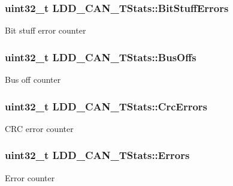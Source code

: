 \subsubsection[{Bit\+Stuff\+Errors}]{\setlength{\rightskip}{0pt plus 5cm}uint32\+\_\+t L\+D\+D\+\_\+\+C\+A\+N\+\_\+\+T\+Stats\+::\+Bit\+Stuff\+Errors}\label{struct_l_d_d___c_a_n___t_stats_a811a427adbc75325167b5073963c676a}
Bit stuff error counter \hypertarget{struct_l_d_d___c_a_n___t_stats_aa01ae74140765599c87675e5df7d8a3d}{}
\subsubsection[{Bus\+Offs}]{\setlength{\rightskip}{0pt plus 5cm}uint32\+\_\+t L\+D\+D\+\_\+\+C\+A\+N\+\_\+\+T\+Stats\+::\+Bus\+Offs}\label{struct_l_d_d___c_a_n___t_stats_aa01ae74140765599c87675e5df7d8a3d}
Bus off counter \hypertarget{struct_l_d_d___c_a_n___t_stats_a27e16f4ddc9cdf544026c4d6ce7b698f}{}
\subsubsection[{Crc\+Errors}]{\setlength{\rightskip}{0pt plus 5cm}uint32\+\_\+t L\+D\+D\+\_\+\+C\+A\+N\+\_\+\+T\+Stats\+::\+Crc\+Errors}\label{struct_l_d_d___c_a_n___t_stats_a27e16f4ddc9cdf544026c4d6ce7b698f}
C\+R\+C error counter \hypertarget{struct_l_d_d___c_a_n___t_stats_a9540270ab882bd0afa615b87afb9e6b3}{}
\subsubsection[{Errors}]{\setlength{\rightskip}{0pt plus 5cm}uint32\+\_\+t L\+D\+D\+\_\+\+C\+A\+N\+\_\+\+T\+Stats\+::\+Errors}\label{struct_l_d_d___c_a_n___t_stats_a9540270ab882bd0afa615b87afb9e6b3}
Error counter \hypertarget{struct_l_d_d___c_a_n___t_stats_a0d783d7e8813ded41cdac8181bab524a}{}

